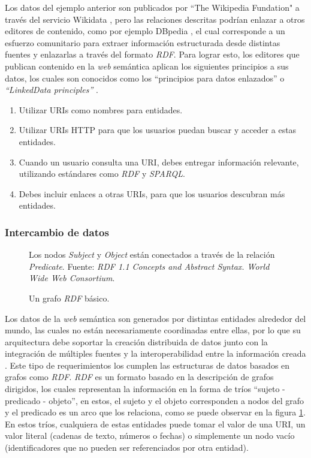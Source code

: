 Los datos del ejemplo anterior son publicados por ``The Wikipedia Fundation" a
través del servicio Wikidata \cite{vrandevcic2014wikidata}, pero las relaciones
descritas podrían enlazar a otros editores de contenido, como por ejemplo
DBpedia \cite{valsecchi2015dbpedia}, el cual corresponde a un esfuerzo comunitario para
extraer información estructurada desde distintas fuentes y enlazarlas a través
del formato \textit{RDF}. Para lograr esto, los editores que publican contenido en la
\textit{web} semántica aplican los siguientes principios a sus datos, los cuales
son conocidos como los ``principios para datos enlazados'' o
\textit{``LinkedData principles''} \cite{bizer2011linked}.

\begin{enumerate}
    \item Utilizar URIs como nombres para entidades.
    \item Utilizar URIs HTTP para que los usuarios puedan buscar y acceder a
    estas entidades.
    \item Cuando un usuario consulta una URI, debes entregar información
    relevante, utilizando estándares como \textit{RDF} y \textit{SPARQL}.
    \item Debes incluir enlaces a otras URIs, para que los usuarios descubran
    más entidades.
\end{enumerate}

\subsubsection{Intercambio de datos}
\label{sec:intercambio-datos}

\begin{figure}
    \centering
    
    \caption{Un grafo \textit{RDF} básico.} Los nodos \textit{Subject} y
    \textit{Object} están conectados a través de la relación \textit{Predicate}.
    Fuente: \textit{RDF 1.1 Concepts and Abstract Syntax. World Wide Web
    Consortium}.
    \label{fig:rdf-graph1}
\end{figure}

Los datos de la \textit{web} semántica son generados por distintas entidades
alrededor del mundo, las cuales no están necesariamente coordinadas entre ellas,
por lo que su arquitectura debe soportar la creación distribuida de datos junto
con la integración de múltiples fuentes y la interoperabilidad entre la
información creada \cite{bizer2011linked}. Este tipo de requerimientos los
cumplen las estructuras de datos basados en grafos como \textit{RDF}.
\textit{RDF} es un formato basado en la descripción de grafos dirigidos, los
cuales representan la información en la forma de tríos ``sujeto - predicado -
objeto'', en estos, el sujeto y el objeto corresponden a nodos del grafo
y el predicado es un arco que los relaciona, como se puede observar en la figura
\ref{fig:rdf-graph1}. En estos tríos, cualquiera de estas entidades puede tomar el
valor de una URI, un valor literal (cadenas de texto, números o fechas) o
simplemente un nodo vacío (identificadores que no pueden ser referenciados por
otra entidad).

